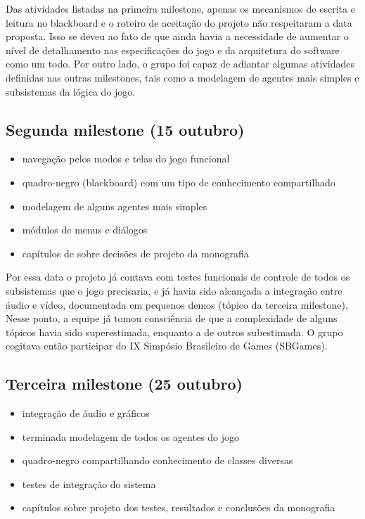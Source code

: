 Das atividades listadas na primeira milestone, apenas os mecanismos de escrita e leitura no blackboard e o roteiro de aceitação do projeto não respeitaram a data proposta. Isso se deveu ao fato de que ainda havia a necessidade de aumentar o nível de detalhamento  nas especificações do jogo e da arquitetura do software como um todo. Por outro lado, o grupo foi capaz de adiantar algumas atividades definidas nas outras milestones, tais como a modelagem de agentes mais simples e subsistemas da lógica do jogo.

\subsection{Segunda milestone (15 outubro)}
\begin{itemize}
\item navegação pelos modos e telas do jogo funcional
\item quadro-negro (blackboard) com um tipo de conhecimento compartilhado
\item modelagem de alguns agentes mais simples
\item módulos de menus e diálogos
\item capítulos de sobre decisões de projeto da monografia
\end{itemize}

Por essa data o projeto já contava com testes funcionais de controle de todos os subsistemas que o jogo precisaria, e já havia sido alcançada a integração entre áudio e vídeo, documentada em pequenos demos (tópico da terceira milestone). Nesse ponto, a equipe já tomou consciência de que a complexidade de alguns tópicos havia sido superestimada, enquanto a de outros subestimada. O grupo cogitava então participar do IX Simpósio Brasileiro de Games (SBGames).

\subsection{Terceira milestone (25 outubro)}
\begin{itemize}
\item integração de áudio e gráficos
\item terminada modelagem de todos os agentes do jogo
\item quadro-negro compartilhando conhecimento de classes diversas
\item testes de integração do sistema
\item capítulos sobre projeto dos testes, resultados e conclusões da monografia
\end{itemize}

